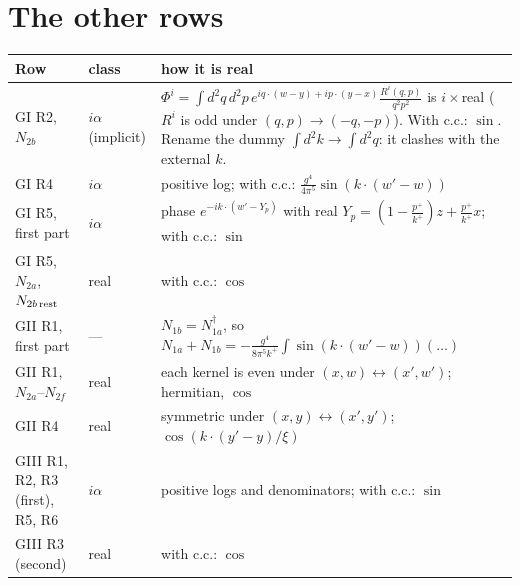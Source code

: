 \documentclass[10pt]{article}
\numberwithin{equation}{section}
\newcommand{\red}[1]{{\color{red}#1}}
\begin{document}
\section{The other rows}
\begin{tabular}{p{}p{}p{}}
\toprule
Row & class & how it is real\\\midrule
GI R2, $N_{2b}$ & $i\alpha$ (implicit) & $\Phi^{i}=\int d^{2}q\,d^{2}p\,e^{iq\cdot(w-y)+ip\cdot(y-x)}\frac{R^{i}(q,p)}{q^{2}p^{2}}$ is $i\times$real ($R^{i}$ is odd under $(q,p)\to(-q,-p)$). With c.c.: $\sin$. \red{Rename the dummy $\int d^{2}k\to\int d^{2}q$: it clashes with the external $k$.}\\
GI R4 & $i\alpha$ & positive log; with c.c.: $\frac{g^{4}}{4\pi^{5}}\sin(k\cdot(w'-w))$\\
GI R5, first part & $i\alpha$ & phase $e^{-ik\cdot(w'-Y_{p})}$ with real $Y_{p}=(1-\frac{p^{+}}{k^{+}})z+\frac{p^{+}}{k^{+}}x$; with c.c.: $\sin$\\
GI R5, $N_{2a}$, $N_{2b\,\rm rest}$ & real & with c.c.: $\cos$\\
GII R1, first part & --- & $N_{1b}=N_{1a}^{\dagger}$, so $N_{1a}+N_{1b}=-\frac{g^{4}}{8\pi^{5}k^{+}}\int\sin(k\cdot(w'-w))(\dots)$\\
GII R1, $N_{2a}$--$N_{2f}$ & real & each kernel is even under $(x,w)\leftrightarrow(x',w')$; hermitian, $\cos$\\
GII R4 & real & symmetric under $(x,y)\leftrightarrow(x',y')$; $\cos(k\cdot(y'-y)/\xi)$\\
GIII R1, R2, R3 (first), R5, R6 & $i\alpha$ & positive logs and denominators; with c.c.: $\sin$\\
GIII R3 (second) & real & with c.c.: $\cos$\\\bottomrule
\end{tabular}
\end{document}
